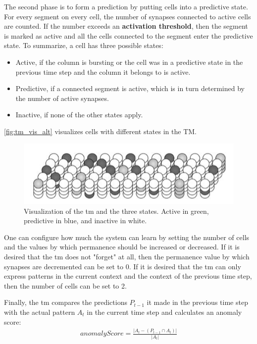 \par
The second phase is to form a prediction by putting cells into a predictive state. For every segment on every cell, the number of synapses connected to active cells are counted. If the number exceeds an \textbf{activation threshold}, then the segment is marked as active and all the cells connected to the segment enter the predictive state. To summarize, a cell has three possible states:
\begin{itemize}
    \item Active, if the column is bursting or the cell was in a predictive state in the previous time step and the column it belongs to is active.
    \item Predictive, if a connected segment is active, which is in turn determined by the number of active synapses.
    \item Inactive, if none of the other states apply.
\end{itemize}
\autoref{fig:tm_vis_alt} visualizes cells with different states in the TM.
\begin{figure}[htb]
    \centering
    \includegraphics[width=0.6\linewidth]{resources/related_works/tm_vis_alt}
    \caption[Visualization of Cell States]{Visualization of the \gls*{tm} and the three states. Active in green, predictive in blue, and inactive in white.}
    \label{fig:tm_vis_alt}
\end{figure}
\par
One can configure how much the system can learn by setting the number of cells and the values by which permanence should be increased or decreased. If it is desired that the \gls*{tm} does not "forget" at all, then the permanence value by which synapses are decremented can be set to 0. If it is desired that the \gls*{tm} can only express patterns in the current context and the context of the previous time step, then the number of cells can be set to 2.
\par
Finally, the \gls*{tm} compares the predictions $P_{t-1}$ it made in the previous time step with the actual pattern $A_t$ in the current time step and calculates an anomaly score:
\begin{align*}
    anomalyScore=\frac{|A_t-(P_{t-1}\cap A_t)|}{|A_t|}
\end{align*}
